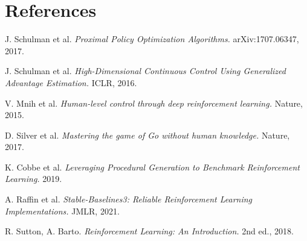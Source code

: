 \documentclass[11pt,a4paper]{article}
\begin{document}
\section*{References}
\begin{enumerate}[label={[\arabic*]},leftmargin=*]
  \item J. Schulman et al. \emph{Proximal Policy Optimization Algorithms.} arXiv:1707.06347, 2017.
  \item J. Schulman et al. \emph{High-Dimensional Continuous Control Using Generalized Advantage Estimation.} ICLR, 2016.
  \item V. Mnih et al. \emph{Human-level control through deep reinforcement learning.} Nature, 2015.
  \item D. Silver et al. \emph{Mastering the game of Go without human knowledge.} Nature, 2017.
  \item K. Cobbe et al. \emph{Leveraging Procedural Generation to Benchmark Reinforcement Learning.} 2019.
  \item A. Raffin et al. \emph{Stable-Baselines3: Reliable Reinforcement Learning Implementations.} JMLR, 2021.
  \item R. Sutton, A. Barto. \emph{Reinforcement Learning: An Introduction.} 2nd ed., 2018.
\end{enumerate}
\end{document}
